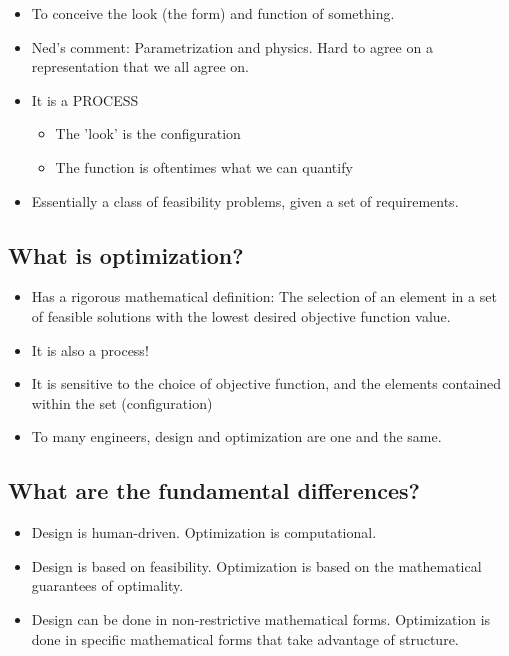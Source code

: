 \begin{itemize}
\item To conceive the look (the form) and function of something. 
\item Ned's comment: Parametrization and physics. Hard to agree on a representation 
that we all agree on. 
\item It is a PROCESS
\begin{itemize}
	\item The 'look' is the configuration
	\item The function is oftentimes what we can quantify
\end{itemize}
\item Essentially a class of feasibility problems, given a set of requirements. 
\end{itemize}

\subsection{What is optimization?}

\begin{itemize}
\item Has a rigorous mathematical definition: The selection of an element in a set 
of feasible solutions with the lowest desired objective function value. 
\item It is also a process!
\item It is sensitive to the choice of objective function, and the elements 
contained within the set (configuration)
\item To many engineers, design and optimization are one and the same. 
\end{itemize}

\subsection{What are the fundamental differences?}

\begin{itemize}
\item Design is human-driven. Optimization is computational. 
\item Design is based on feasibility. Optimization is based on the mathematical 
guarantees of optimality. 
\item Design can be done in non-restrictive mathematical forms. Optimization is 
done in specific mathematical forms that take advantage of structure. 
\end{itemize}

